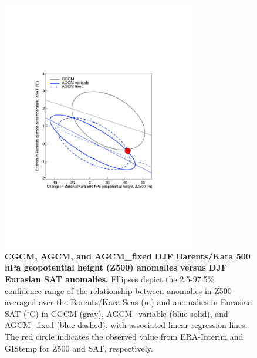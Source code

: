\documentclass{nature}
\begin{document}
\begin{figure}%
\centering
\noindent\includegraphics[width=20pc]{Word/Figure_4.pdf}
\caption{\textbf{CGCM, AGCM, and AGCM\_fixed DJF Barents/Kara 500 hPa geopotential height (Z500) anomalies versus DJF Eurasian SAT anomalies.} Ellipses depict the 2.5-97.5\% confidence range of the relationship between anomalies in Z500 averaged over the Barents/Kara Seas (m) and anomalies in Eurasian SAT ($^\circ$C) in CGCM (gray), AGCM\_variable (blue solid), and AGCM\_fixed (blue dashed), with associated linear regression lines. The red circle indicates the observed value from ERA-Interim and GIStemp for Z500 and SAT, respectively. 
} %
\label{fig:fig4} 
\end{figure}
\end{document}
